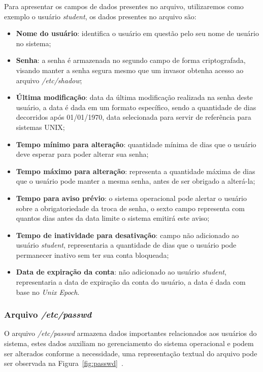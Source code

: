 \documentclass[
    12pt,				%
    oneside,   	        %
    a4paper,			%
    english,			%
    french,				%
    spanish,			%
    brazil,				%
    ]{pacotes/abntex2}
\begin{document}
Para apresentar os campos de dados presentes no arquivo, utilizaremos como exemplo o usuário \textit{student}, os dados presentes no arquivo são:
\begin{itemize}
    \item \textbf{Nome do usuário}: identifica o usuário em questão pelo seu nome de usuário no sistema;
    \item \textbf{Senha}: a senha é armazenada no segundo campo de forma criptografada, visando manter a senha segura mesmo que um invasor obtenha acesso ao arquivo \textit{/etc/shadow};
    \item \textbf{Última modificação}: data da última modificação realizada na senha deste usuário, a data é dada em um formato específico, sendo a quantidade de dias decorridos após 01/01/1970, data selecionada para servir de referência para sistemas UNIX;
    \item \textbf{Tempo mínimo para alteração}: quantidade mínima de dias que o usuário deve esperar para poder alterar sua senha;
    \item \textbf{Tempo máximo para alteração}: representa a quantidade máxima de dias que o usuário pode manter a mesma senha, antes de ser obrigado a alterá-la;
    \item \textbf{Tempo para aviso prévio}: o sistema operacional pode alertar o usuário sobre a obrigatoriedade da troca de senha, o sexto campo representa com quantos dias antes da data limite o sistema emitirá este aviso;
    \item \textbf{Tempo de inatividade para desativação}: campo não adicionado ao usuário \textit{student}, representaria a quantidade de dias que o usuário pode permanecer inativo sem ter sua conta bloqueada;
    \item \textbf{Data de expiração da conta}: não adicionado ao usuário \textit{student}, representaria a data de expiração da conta do usuário, a data é dada com base no \textit{Unix Epoch}.
\end{itemize}

\subsubsection{Arquivo \textit{/etc/passwd}}
O arquivo \textit{/etc/passwd} armazena dados importantes relacionados aos usuários do sistema, estes dados auxiliam no gerenciamento do sistema operacional e podem ser alterados conforme a necessidade, uma representação textual do arquivo pode ser observada na Figura~\ref{fig:passwd}~\cite{guiafocaSegurança}. 
\end{document}
